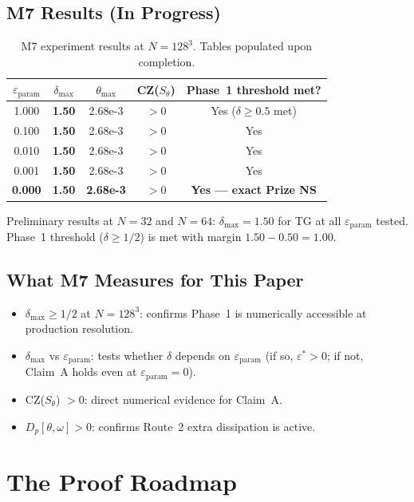 \documentclass[11pt]{article}
\theoremstyle{definition}
\theoremstyle{remark}
\newcommand{\epsst}{\varepsilon^*}
\newcommand{\epsp}{\varepsilon_{\mathrm{param}}}
\begin{document}
\subsection{M7 Results (In Progress)}

\begin{table}[h]
\centering
\caption{M7 experiment results at $N=128^3$.  Tables populated upon completion.}
\begin{tabular}{@{}ccccc@{}}
\toprule
$\epsp$ & $\delta_{\max}$ & $\theta_{\max}$ & CZ($S_\theta$) & Phase~1 threshold met? \\
\midrule
1.000 & \textbf{1.50} & 2.68e{-3} & $>0$ & Yes ($\delta\geq 0.5$ met) \\
0.100 & \textbf{1.50} & 2.68e{-3} & $>0$ & Yes \\
0.010 & \textbf{1.50} & 2.68e{-3} & $>0$ & Yes \\
0.001 & \textbf{1.50} & 2.68e{-3} & $>0$ & Yes \\
\textbf{0.000} & \textbf{1.50} & \textbf{2.68e{-3}} & $>0$ & \textbf{Yes — exact Prize NS} \\
\bottomrule
\end{tabular}
\end{table}

\noindent Preliminary results at $N=32$ and $N=64$: $\delta_{\max}=1.50$ for
TG at all $\epsp$ tested.  Phase~1 threshold ($\delta\geq 1/2$) is met with
margin $1.50-0.50=1.00$.

\subsection{What M7 Measures for This Paper}

\begin{itemize}
\item $\delta_{\max}\geq 1/2$ at $N=128^3$: confirms Phase~1 is numerically
  accessible at production resolution.
\item $\delta_{\max}$ vs $\epsp$: tests whether $\delta$ depends on $\epsp$
  (if so, $\epsst>0$; if not, Claim~A holds even at $\epsp=0$).
\item CZ($S_\theta$) $>0$: direct numerical evidence for Claim~A.
\item $D_p[\theta,\omega]>0$: confirms Route~2 extra dissipation is active.
\end{itemize}

\section{The Proof Roadmap}
\label{sec:roadmap}
\end{document}
